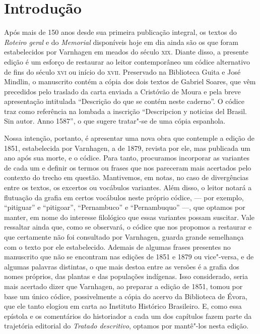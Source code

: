 \chapter[Introdução, \emph{por Fernanda Trindade Luciani}]{Introdução}




Após mais de 150 anos desde sua primeira publicação
integral, os textos do \textit{Roteiro geral} e do \textit{Memorial}
disponíveis hoje em dia ainda são os que foram estabelecidos por
Varnhagen em meados do século \textsc{xix}. Diante disso, a presente edição é um
esforço de restaurar ao leitor contemporâneo um códice alternativo de
fins do século \textsc{xvi} ou início do \textsc{xvii}. Preservado na Biblioteca Guita e
José Mindlin, o manuscrito contém a cópia dos dois textos de Gabriel
Soares, que vêm precedidos pelo traslado da carta enviada a
Cristóvão de Moura e pela breve apresentação intitulada “Descrição do
que se contém neste caderno”.  O códice traz como referência na lombada
a inscrição “Descripcion y noticias del Brasil. Sin autor. Anno 1587”,
o que sugere tratar"-se de uma cópia espanhola.

Nossa intenção, portanto, é apresentar uma nova obra que contemple a edição
de 1851, estabelecida por Varnhagen, a de 1879, revista por ele, mas publicada um ano após sua
morte, e o códice. Para tanto, procuramos incorporar as
variantes de cada um e definir os termos ou frases que nos pareceram
mais acertados pelo contexto do trecho em questão. Mantivemos, em
notas, no caso de divergências entre os textos, os excertos ou
vocábulos variantes. Além disso, o leitor notará a flutuação da grafia 
em certos vocábulos neste próprio códice, --- por exemplo, ``pitiguar'' e ``pitigoar'', 
``Pernambuco'' e ``Pernambuquo'' ---, que optamos por manter, em nome do interesse 
filológico que essas variantes possam suscitar.
 Vale ressaltar ainda que, como se observará, o
códice que nos propomos a restaurar e que certamente não foi consultado
por Varnhagen, guarda grande semelhança com o texto por ele
estabelecido. Ademais de algumas frases presentes no manuscrito que não
se encontram nas edições de 1851 e 1879 ou vice"-versa, e de algumas
palavras distintas, o que mais destoa entre as versões é a grafia dos
nomes próprios, das plantas e das populações indígenas. Isso
considerado, seria mais acertado dizer que Varnhagen, ao preparar a
edição de 1851, tomou por base um único códice, possivelmente a cópia
do acervo da Biblioteca de Évora, que ele tanto elogiou em carta ao
Instituto Histórico Brasileiro. E, como essa epístola e os comentários
do historiador a cada um dos capítulos fazem parte da trajetória
editorial do \textit{Tratado descritivo}, optamos por mantê"-los nesta edição. 

